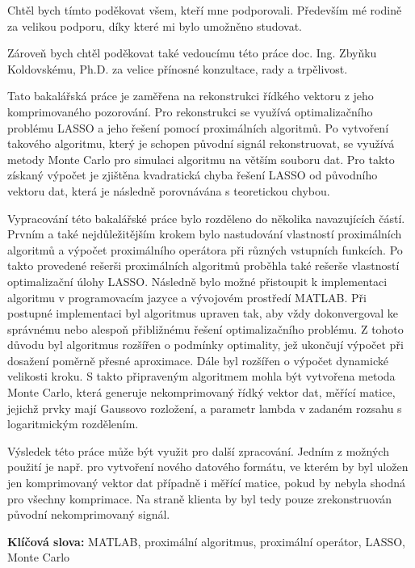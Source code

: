 \documentclass[FM,BP]{tulthesis}
\begin{document}
\begin{acknowledgement}
Chtěl bych tímto poděkovat všem, kteří mne podporovali. Především mé rodině za velikou podporu, díky které mi bylo umožněno studovat. 


Zároveň bych chtěl poděkovat také vedoucímu této práce doc. Ing. Zbyňku Koldovskému, Ph.D. za velice přínosné konzultace, rady a trpělivost.
\end{acknowledgement}
\clearpage
\begin{abstractCZ}
Tato bakalářská práce je zaměřena na rekonstrukci řídkého vektoru z jeho komprimovaného pozorování. Pro rekonstrukci se využívá optimalizačního problému LASSO a jeho řešení pomocí proximálních algoritmů. Po vytvoření takového algoritmu, který je schopen původní signál rekonstruovat, se využívá metody Monte Carlo pro simulaci algoritmu na větším souboru dat. Pro takto získaný výpočet je zjištěna kvadratická chyba řešení LASSO od původního vektoru dat, která je následně porovnávána s teoretickou chybou.


Vypracování této bakalářské práce bylo rozděleno do několika navazujících částí. Prvním a také nejdůležitějším krokem bylo nastudování vlastností proximálních algoritmů a výpočet proximálního operátora při různých vstupních funkcích. Po takto provedené rešerši proximálních algoritmů proběhla také rešerše vlastností optimalizační úlohy LASSO. Následně bylo možné přistoupit k implementaci algoritmu v programovacím jazyce a vývojovém prostředí MATLAB. Při postupné implementaci byl algoritmus upraven tak, aby vždy dokonvergoval ke správnému nebo alespoň přibližnému řešení optimalizačního problému. Z tohoto důvodu byl algoritmus rozšířen o podmínky optimality, jež ukončují výpočet při dosažení poměrně přesné aproximace. Dále byl rozšířen o výpočet dynamické velikosti kroku. S takto připraveným algoritmem mohla být vytvořena metoda Monte Carlo, která generuje nekomprimovaný řídký vektor dat, měřící matice, jejichž prvky mají Gaussovo rozložení, a parametr lambda v zadaném rozsahu s logaritmickým rozdělením.  


Výsledek této práce může být využit pro další zpracování. Jedním z možných použití je např. pro vytvoření nového datového formátu, ve kterém by byl uložen jen komprimovaný vektor dat případně i měřící matice, pokud by nebyla shodná pro všechny komprimace. Na straně klienta by byl tedy pouze zrekonstruován původní nekomprimovaný signál.


\textbf{Klíčová slova:} MATLAB, proximální algoritmus, proximální operátor, LASSO, Monte Carlo
\end{abstractCZ}
\end{document}
